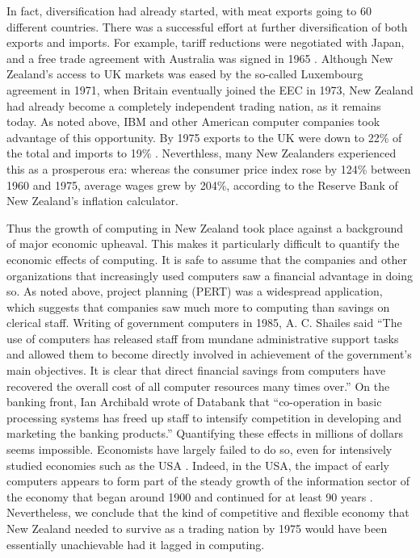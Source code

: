 \documentclass{IEEEcsmag}
\begin{document}
In fact, diversification had already started, with meat exports going to 60 different countries.
There was a successful effort at further diversification of both
exports and imports. For example, tariff reductions were negotiated with Japan, and a free trade agreement
with Australia was signed in 1965 \cite{EncycTrade}.
Although New Zealand’s access to UK markets was eased by the so-called Luxembourg agreement in 1971,
when Britain eventually joined the EEC in 1973, New Zealand had already become a completely independent
trading nation, as it remains today. As noted above, IBM and other American computer
companies took advantage of this opportunity. By 1975 exports to the UK were down to 22\%
of the total and imports to 19\% \cite{Yearbook77}. Neverthless, many New Zealanders
experienced this as a prosperous era: whereas the consumer price index rose by 124\% between 1960 and 1975,
average wages grew by 204\%, according to the Reserve Bank of New Zealand's inflation calculator.

Thus the growth of computing in New Zealand took place against a background of major
economic upheaval. This makes it particularly difficult to quantify the economic effects of computing.
It is safe to assume that the companies and other organizations that increasingly used
computers saw a financial advantage in doing so. As noted above, project planning (PERT)
was a widespread application, which suggests that companies saw much more to computing than
savings on clerical staff. Writing of government computers in 1985, A. C. Shailes \cite{Shailes} said
“The use of computers has released staff from mundane administrative support tasks and
allowed them to become directly involved in achievement of the government’s main objectives.
It is clear that direct financial savings from computers have recovered the overall cost of all
computer resources many times over.” On the banking front, Ian Archibald \cite{Archibald} wrote
of Databank that “co-operation in basic processing systems has freed up staff to intensify competition
in developing and marketing the banking products.” Quantifying these effects in millions of dollars
seems impossible. Economists have largely failed to do so, even for intensively studied
economies such as the USA \cite{Oliner-1994}. Indeed, in the USA, the impact of early computers
appears to form part of the steady growth of the information sector of the economy that began
around 1900 and continued for at least 90 years \cite{Sichel-1997}. 
Nevertheless, we conclude that the kind of competitive and flexible economy that New Zealand
needed to survive as a trading nation by 1975 would have
been essentially unachievable had it lagged in computing.
\end{document}
